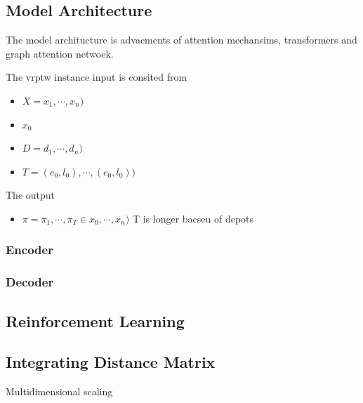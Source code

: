     \subsection{Model Architecture}
    The model architucture \cite{attention-route} is advacments of attention mechansims, transformers and graph attention netwoek.
    
    The \gls{vrptw} instance input is consited from
    \begin{itemize}
        \item $X = {x_1, \cdots, x_n})$
        \item $x_0$
        \item $D = {d_1, \cdots, d_n})$
        \item $T = {(e_0, l_0), \cdots, (e_0, l_0)})$
    \end{itemize}
    
    The output
    \begin{itemize}
        \item $\pi = {\pi_1, \cdots, \pi_T} \in {x_0, \cdots, x_n})$ T is longer bacseu of depots
    \end{itemize}
    
    \subsubsection{Encoder}
    
    \subsubsection{Decoder}
        
    \subsection{Reinforcement Learning}
        
    \subsection{Integrating Distance Matrix}
    Multidimensional scaling
